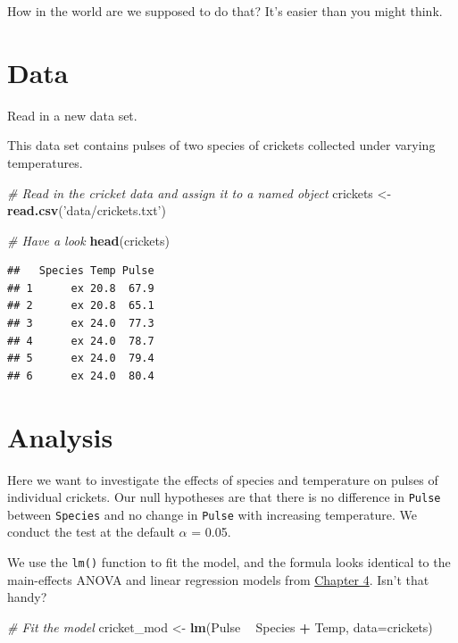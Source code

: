 \documentclass[
]{book}
\newenvironment{Shaded}{\begin{snugshade}}{\end{snugshade}}
\newcommand{\CommentTok}[1]{\textcolor[rgb]{0.56,0.35,0.01}{\textit{#1}}}
\newcommand{\DataTypeTok}[1]{\textcolor[rgb]{0.13,0.29,0.53}{#1}}
\newcommand{\KeywordTok}[1]{\textcolor[rgb]{0.13,0.29,0.53}{\textbf{#1}}}
\newcommand{\NormalTok}[1]{#1}
\newcommand{\OperatorTok}[1]{\textcolor[rgb]{0.81,0.36,0.00}{\textbf{#1}}}
\newcommand{\StringTok}[1]{\textcolor[rgb]{0.31,0.60,0.02}{#1}}
\begin{document}
How in the world are we supposed to do that? It's easier than you might think.

\hypertarget{data}{%
\section{Data}\label{data}}

Read in a new data set.

This data set contains pulses of two species of crickets collected under varying temperatures.

\begin{Shaded}
\begin{Highlighting}[]
\CommentTok{# Read in the cricket data and assign it to a named object}
\NormalTok{crickets <-}\StringTok{ }\KeywordTok{read.csv}\NormalTok{(}\StringTok{'data/crickets.txt'}\NormalTok{)}

\CommentTok{# Have a look}
\KeywordTok{head}\NormalTok{(crickets)}
\end{Highlighting}
\end{Shaded}

\begin{verbatim}
##   Species Temp Pulse
## 1      ex 20.8  67.9
## 2      ex 20.8  65.1
## 3      ex 24.0  77.3
## 4      ex 24.0  78.7
## 5      ex 24.0  79.4
## 6      ex 24.0  80.4
\end{verbatim}

\hypertarget{analysis}{%
\section{Analysis}\label{analysis}}

Here we want to investigate the effects of species and temperature on
pulses of individual crickets. Our null hypotheses are that there is no difference in \texttt{Pulse} between \texttt{Species} and no change in \texttt{Pulse} with increasing temperature. We conduct the test at the default \(\alpha\) = 0.05.

We use the \texttt{lm()} function to fit the model, and the formula looks identical to the main-effects ANOVA and linear regression models from \protect\hyperlink{Chapter4}{Chapter 4}. Isn't that handy?

\begin{Shaded}
\begin{Highlighting}[]
\CommentTok{# Fit the model}
\NormalTok{cricket_mod <-}\StringTok{ }\KeywordTok{lm}\NormalTok{(Pulse }\OperatorTok{~}\StringTok{ }\NormalTok{Species }\OperatorTok{+}\StringTok{ }\NormalTok{Temp, }\DataTypeTok{data=}\NormalTok{crickets)}
\end{Highlighting}
\end{Shaded}
\end{document}
